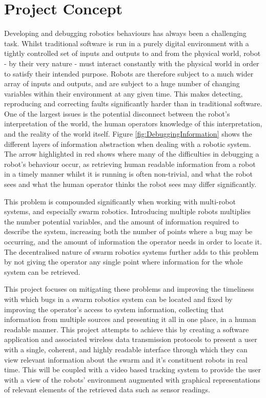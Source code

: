 
\section{Project Concept}
Developing and debugging robotics behaviours has always been a challenging task. Whilst traditional software is run in a purely digital environment with a tightly controlled set of inputs and outputs to and from the physical world, robot - by their very nature - must interact constantly with the physical world in order to satisfy their intended purpose. Robots are therefore subject to a much wider array of inputs and outputs, and are subject to a huge number of changing variables within their environment at any given time. This makes detecting, reproducing and correcting faults significantly harder than in traditional software. One of the largest issues is the potential disconnect between the robot's interpretation of the world, the human operators knowledge of this interpretation, and the reality of the world itself. Figure \ref{fig:DebuggingInformation} shows the different layers of information abstraction when dealing with a robotic system. The arrow highlighted in red shows where many of the difficulties in debugging a robot's behaviour occur, as retrieving human readable information from a robot in a timely manner whilst it is running is often non-trivial, and what the robot sees and what the human operator thinks the robot sees may differ significantly.

This problem is compounded significantly when working with multi-robot systems, and especially swarm robotics. Introducing multiple robots multiplies the number potential variables, and the amount of information required to describe the system, increasing both the number of points where a bug may be occurring, and the amount of information the operator needs in order to locate it. The decentralised nature of swarm robotics systems further adds to this problem by not giving the operator any single point where information for the whole system can be retrieved.

This project focuses on mitigating these problems and improving the timeliness with which bugs in a swarm robotics system can be located and fixed by improving the operator's access to system information, collecting that information from multiple sources and presenting it all in one place, in a human readable manner. This project attempts to achieve this by creating a software application and associated wireless data transmission protocols to present a user with a single, coherent, and highly readable interface through which they can view relevant information about the swarm and it's constituent robots in real time. This will be coupled with a video based tracking system to provide the user with a view of the robots' environment augmented with graphical representations of relevant elements of the retrieved data such as sensor readings.

